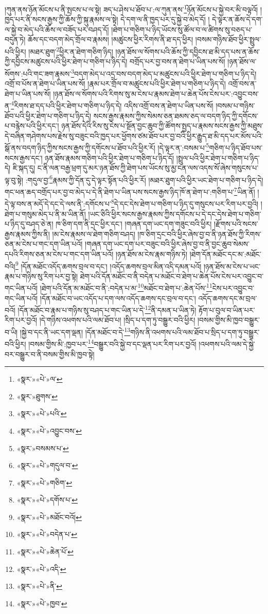 །ཀུན་ནས་ཉོན་མོངས་པ་ནི་སྤངས་པ་ལ་སྟེ། ཟད་པ་ཤེས་པ་ཐོབ་པ་:ལ་ཀུན་ནས་\footnote{«སྣར་»«པེ་»ལ་}ཉོན་མོངས་པ་སྐྱེ་བར་མི་བལྟའོ། །ཁྱད་པར་ནི་སངས་རྒྱས་ཀྱི་ཆོས་ཀྱི་སྐུ་རྣམས་ལ་སྟེ། དེ་དག་ལ་ནི་ཁྱད་པར་དུ་སྐྱེ་བ་མེད་དོ། །
དེ་ལྟར་ན་ཆོས་དེ་དག་ལ་སྐྱེ་བ་མེད་པའི་ཆོས་ལ་བཟོད་པར་བཤད་དོ། །ཐེག་པ་གཅིག་པ་ཉིད་ཡོངས་སུ་ཚོལ་བ་ལ་ཚིགས་སུ་བཅད་པ་བདུན་ཏེ། ཆོས་དང་བདག་མེད་གྲོལ་བ་རྣམས། །མཚུངས་ཕྱིར་རིགས་ནི་ཐ་དད་ཕྱིར། །བསམ་གཉིས་ཐོབ་ཕྱིར་སྤྲུལ་པའི་ཕྱིར། །མཐར་ཐུག་\footnote{«སྣར་»ཐུགས་}ཕྱིར་ན་ཐེག་གཅིག་ཉིད། །ཉན་ཐོས་ལ་སོགས་པའི་ཆོས་ཀྱི་དབྱིངས་ཐ་མི་དད་པས་ན་ཆོས་ཀྱི་དབྱིངས་མཚུངས་པའི་ཕྱིར་ཐེག་པ་གཅིག་པ་ཉིད་དེ། བགྲོད་པར་བྱ་བས་ན་ཐེག་པ་ཡིན་པས་སོ། །ཉན་ཐོས་ལ་སོགས་:པའི་གང་ཟག་རྣམས་\footnote{«སྣར་»«པེ་»པའི་}བདག་མེད་པ་འདྲ་བས་བདག་མེད་པ་མཚུངས་པའི་ཕྱིར་ཐེག་པ་གཅིག་པ་ཉིད་དེ། འགྲོ་བ་པོས་ན་ཐེག་པ་ཡིན་པས་སོ། །རྣམ་པར་གྲོལ་བ་མཚུངས་པའི་ཕྱིར་ཐེག་པ་གཅིག་པ་ཉིད་དེ། འགྲོ་བས་ན་ཐེག་པ་ཡིན་པས་སོ། །ཉན་ཐོས་ལ་སོགས་པའི་རིགས་སུ་མ་ངེས་པ་རྣམས་ཐེག་པ་ཆེན་པོས་ངེས་པར་:འབྱུང་བས་ན་\footnote{«སྣར་»«པེ་»འབྱུང་བས་}རིགས་ཐ་དད་པའི་ཕྱིར་ཐེག་པ་གཅིག་པ་ཉིད་དེ། འདིས་འགྲོ་བས་ན་ཐེག་པ་ཡིན་པས་སོ། །བསམ་པ་གཉིས་ཐོབ་པའི་ཕྱིར་ཐེག་པ་གཅིག་པ་ཉིད་དེ། སངས་རྒྱས་རྣམས་ཀྱིས་སེམས་ཅན་ཐམས་ཅད་ལ་བདག་ཉིད་ཀྱི་དགོངས་པ་བརྙེས་པའི་ཕྱིར་དང་། ཉན་ཐོས་དེའི་རིས་སུ་ངེས་པ་སྔོན་བྱང་ཆུབ་ཀྱི་ཚོགས་སྤྱད་པ་རྣམས་སངས་རྒྱས་ཀྱི་མཐུས་དེ་བཞིན་གཤེགས་པས་རྗེས་སུ་བཟུང་བའི་ཁྱད་པར་ཕྱོགས་ཙམ་ཐོབ་པར་བྱ་བའི་ཕྱིར་རྒྱུད་ཐ་མི་དད་པར་མོས་པའི་སྒོ་ནས་བདག་ཉིད་ཀྱིས་སངས་རྒྱས་ཀྱི་དགོངས་པ་ཐོབ་པའི་ཕྱིར་རོ། །དེ་ལྟར་ན་:བསམ་པ་\footnote{«སྣར་»བསམས་པ་}གཅིག་པ་ཉིད་ཐོབ་པས་སངས་རྒྱས་དང་། ཉན་ཐོས་རྣམས་གཅིག་པའི་ཕྱིར་ཐེག་པ་གཅིག་པ་ཉིད་དོ། །སྤྲུལ་པའི་ཕྱིར་ཐེག་པ་གཅིག་པ་ཉིད་དེ། ཇི་སྐད་དུ། ང་ནི་ལན་བརྒྱ་ཕྲག་དུ་མར་ཉན་ཐོས་ཀྱི་ཐེག་པས་ཡོངས་སུ་མྱ་ངན་ལས་འདས་སོ་ཞེས་གསུངས་པ་ལྟ་བུ་སྟེ། :གདུལ་བྱ་\footnote{«སྣར་»«པེ་»གདུལ་བ་}རྣམས་ཀྱི་དོན་དུ་དེ་ལྟར་སྟོན་པའི་ཕྱིར་རོ། །མཐར་ཐུག་པའི་ཕྱིར་ཡང་ཐེག་པ་གཅིག་པ་ཉིད་དེ། གང་ཕན་ཆད་བགྲོད་པར་བྱ་བ་མེད་པ་དེ་ནི་ཐེག་པ་ཡིན་པས་སངས་རྒྱས་ཉིད་ཁོ་ན་ཐེག་པ་:གཅིག་པ་\footnote{«སྣར་»«པེ་»གཅིག་}ཡིན་ནོ། །དེ་ལྟ་བས་ན་མདོ་དེ་དང་དེ་ལས་ནི་:དགོངས་པ་\footnote{«སྣར་»«པེ་»དགོས་པ་}དེ་དང་དེས་ཐེག་པ་གཅིག་པ་ཉིད་དུ་གསུངས་པར་རིག་པར་བྱའི། །ཐེག་པ་གསུམ་མེད་པ་ནི་མ་ཡིན་ནོ། །ཡང་ཅིའི་ཕྱིར་སངས་རྒྱས་རྣམས་ཀྱིས་དགོངས་པ་དེ་དང་དེས་ཐེག་པ་གཅིག་པ་ཉིད་དུ་བཤད་ཅེ་ན། ཁ་ཅིག་དག་ནི་དྲང་ཕྱིར་དང་། །གཞན་དག་ཡང་དག་གཟུང་བའི་ཕྱིར། །རྫོགས་པའི་སངས་རྒྱས་རྣམས་ཀྱིས་ནི། །མ་ངེས་རྣམས་ལ་ཐེག་གཅིག་བཤད། །ཁ་ཅིག་དྲང་བའི་ཕྱིར་ཞེས་བྱ་བ་ནི་ཉན་ཐོས་ཀྱི་རིགས་ཅན་མ་ངེས་པ་གང་དག་ཡིན་པའོ། །གཞན་དག་ཡང་དག་པར་བཟུང་བའི་ཕྱིར་ཞེས་བྱ་བ་ནི་བྱང་ཆུབ་སེམས་དཔའི་རིགས་ཅན་མ་ངེས་པ་གང་དག་ཡིན་པའོ། །ཉན་ཐོས་མ་ངེས་རྣམ་གཉིས་ཏེ། །ཐེག་དོན་མཐོང་དང་མ་:མཐོང་བའི།\footnote{«སྣར་»«པེ་»མཐོང་བའོ།} །དོན་མཐོང་འདོད་ཆགས་བྲལ་བ་དང་། །འདོད་ཆགས་བྲལ་མིན་འདི་དམན་པའོ། །ཉན་ཐོས་མ་ངེས་པ་ཡང་རྣམ་པ་གཉིས་སུ་རིག་པར་བྱ་སྟེ། ཐེག་པའི་དོན་མཐོང་བ་ནི་བདེན་པ་མཐོང་བ་ཐེག་པ་ཆེན་པོས་ངེས་པར་འབྱུང་བ་གང་ཡིན་པའོ། །ཐེག་པའི་དོན་མ་མཐོང་བ་ནི་:བདེན་པ་མ་\footnote{«སྣར་»«པེ་»བདེན་པ་}མཐོང་བ་ཐེག་པ་:ཆེན་པོས་\footnote{«སྣར་»«པེ་»ཆེན་པོ་}ངེས་པར་འབྱུང་བ་གང་ཡིན་པའོ། །དོན་མཐོང་བ་ཡང་འདོད་པ་དག་ལས་འདོད་ཆགས་དང་བྲལ་བ་དང་། འདོད་ཆགས་དང་མ་བྲལ་བའོ། །དོན་མཐོང་བ་རྣམ་པ་གཉིས་སུ་བཤད་པ་གང་ཡིན་པ་དེ་\footnote{«སྣར་»«པེ་»འདི་}ནི་དམན་པ་ཡིན་ཏེ། རྟོག་པ་བུལ་བ་ཡིན་པར་རིག་པར་བྱའོ། །དེ་གཉིས་འཕགས་པའི་ལམ་ཐོབ་པ། །སྲིད་པ་དག་ཏུ་བསྒྱུར་བའི་ཕྱིར། །བསམ་གྱིས་མི་ཁྱབ་བསྒྱུར་བ་ཡི། །སྐྱེ་བ་དང་ནི་ཡང་དག་ལྡན། །དོན་མཐོང་བ་དེ་\footnote{«སྣར་»«པེ་»ནི་}གཉིས་ནི་འཕགས་པའི་ལམ་ཐོབ་པ་སྲིད་པ་དག་ཏུ་བསྒྱུར་བའི་ཕྱིར། །བསམ་གྱིས་མི་:ཁྱབ་པར་\footnote{«སྣར་»«པེ་»ཁྱབ་}བསྒྱུར་བའི་སྐྱེ་བ་དང་ལྡན་པར་རིག་པར་བྱའོ། །འཕགས་པའི་ལམ་དེ་སྐྱེ་བར་བསྒྱུར་བ་ནི་བསམ་གྱིས་མི་ཁྱབ་སྟེ། 